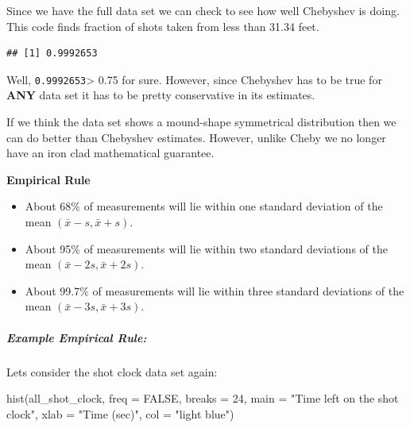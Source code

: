 \documentclass[
]{book}
\newenvironment{Shaded}{\begin{snugshade}}{\end{snugshade}}
\newcommand{\AttributeTok}[1]{\textcolor[rgb]{0.77,0.63,0.00}{#1}}
\newcommand{\ConstantTok}[1]{\textcolor[rgb]{0.00,0.00,0.00}{#1}}
\newcommand{\DecValTok}[1]{\textcolor[rgb]{0.00,0.00,0.81}{#1}}
\newcommand{\FloatTok}[1]{\textcolor[rgb]{0.00,0.00,0.81}{#1}}
\newcommand{\FunctionTok}[1]{\textcolor[rgb]{0.00,0.00,0.00}{#1}}
\newcommand{\NormalTok}[1]{#1}
\newcommand{\SpecialCharTok}[1]{\textcolor[rgb]{0.00,0.00,0.00}{#1}}
\newcommand{\StringTok}[1]{\textcolor[rgb]{0.31,0.60,0.02}{#1}}
\providecommand{\tightlist}{%
  \setlength{\itemsep}{0pt}\setlength{\parskip}{0pt}}
\theoremstyle{definition}
\theoremstyle{definition}
\theoremstyle{definition}
\theoremstyle{definition}
\theoremstyle{remark}
\begin{document}
Since we have the full data set we can check to see how well Chebyshev is doing. This code finds fraction of shots taken from less than 31.34 feet.

\begin{Shaded}
\end{Shaded}

\begin{verbatim}
## [1] 0.9992653
\end{verbatim}

Well, \texttt{0.9992653}\textgreater{} 0.75 for sure. However, since Chebyshev has to be true for \textbf{ANY} data set it has to be pretty conservative in its estimates.

If we think the data set shows a mound-shape symmetrical distribution then we can do better than Chebyshev estimates. However, unlike Cheby we no longer have an iron clad mathematical guarantee.

\textbf{Empirical Rule}

\begin{itemize}
\tightlist
\item
  About 68\% of measurements will lie within one standard deviation of the mean \((\bar{x}-s, \bar{x}+s)\).
\item
  About 95\% of measurements will lie within two standard deviations of the mean \((\bar{x}-2s, \bar{x}+2s)\).
\item
  About 99.7\% of measurements will lie within three standard deviations of the mean \((\bar{x}-3s, \bar{x}+3s)\).
\end{itemize}

\hypertarget{example-empirical-rule}{%
\subparagraph{Example Empirical Rule:}\label{example-empirical-rule}}

Lets consider the shot clock data set again:

\begin{Shaded}
\begin{Highlighting}[]
\FunctionTok{hist}\NormalTok{(all\_shot\_clock, }\AttributeTok{freq =} \ConstantTok{FALSE}\NormalTok{, }\AttributeTok{breaks =} \DecValTok{24}\NormalTok{, }\AttributeTok{main =} \StringTok{"Time left on the shot clock"}\NormalTok{,}
    \AttributeTok{xlab =} \StringTok{"Time (sec)"}\NormalTok{, }\AttributeTok{col =} \StringTok{"light blue"}\NormalTok{)}
\end{Highlighting}
\end{Shaded}
\end{document}

